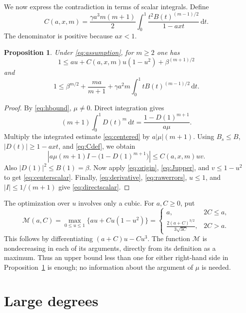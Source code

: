\documentclass[11pt,letterpaper,reqno]{amsart}
\newtheorem{prop}[thm]{Proposition}
\theoremstyle{definition}
\numberwithin{equation}{section}
\newcommand{\dd}{\,\mathrm d}
\newcommand{\M}{\mathcal M}
\begin{document}
We now express the contradiction in terms of scalar integrals. Define
\begin{equation}\label{eq:Cdef}
 C(a,x,m)=\frac{\gamma a^3m(m+1)}2
      \int_0^1\frac{t^2B(t)^{(m-1)/2}}{1-axt}\dd t.
\end{equation}
The denominator is positive because $ax<1$.

\begin{prop}\label{prop:scalar}
Under \eqref{eq:assumption}, for $m\ge2$ one has
\begin{equation}\label{eq:centerscalar}
 1\le au+C(a,x,m)u(1-u^2)+\beta^{(m+1)/2}
\end{equation}
and
\begin{equation}\label{eq:directscalar}
 1\le\beta^{m/2}+\frac{ma}{m+1}
       +\gamma a^2m\int_0^1tB(t)^{(m-1)/2}\dd t.
\end{equation}
\end{prop}

\begin{proof}
By \eqref{eq:hbound}, $\mu\ne0$. Direct integration gives
\[
 (m+1)\int_0^1D(t)^m\dd t
 =\frac{1-D(1)^{m+1}}{a\mu}.
\]
Multiply the integrated estimate \eqref{eq:centered} by $a|\mu|(m+1)$. Using $B_s\le B$, $|D(t)|\ge1-axt$, and \eqref{eq:Cdef}, we obtain
\[
 \left|a\mu(m+1)I-\bigl(1-D(1)^{m+1}\bigr)\right|
 \le C(a,x,m)uv.
\]
Also $|D(1)|^2\le B(1)=\beta$. Now apply \eqref{eq:origin}, \eqref{eq:Jupper}, and $v\le1-u^2$ to get \eqref{eq:centerscalar}. Finally, \eqref{eq:derivative}, \eqref{eq:rawerrors}, $u\le1$, and $|I|\le1/(m+1)$ give \eqref{eq:directscalar}.
\end{proof}

The optimization over $u$ involves only a cubic. For $a,C\ge0$, put
\begin{equation}\label{eq:cubicmax}
 \M(a,C)=\max_{0\le u\le1}\{au+Cu(1-u^2)\}
 =\begin{cases}
 a,&2C\le a,\\[1mm]
 \displaystyle\frac{2(a+C)^{3/2}}{3\sqrt{3C}},&2C>a.
 \end{cases}
\end{equation}
This follows by differentiating $(a+C)u-Cu^3$. The function $\M$ is nondecreasing in each of its arguments, directly from its definition as a maximum. Thus an upper bound less than one for either right-hand side in Proposition~\ref{prop:scalar} is enough; no information about the argument of $\mu$ is needed.

\section{Large degrees}\label{sec:large}
\end{document}
